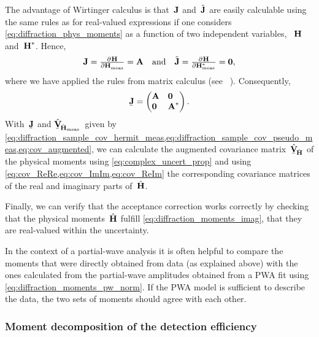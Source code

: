 The advantage of Wirtinger calculus is that~$\bm{\mathrm{J}}$
and~$\tilde{\bm{\mathrm{J}}}$ are easily calculable using the same rules as
for real-valued expressions if one considers
\cref{eq:diffraction_phys_moments} as a function of two independent
variables, ~$\bm{\mathrm{H}}$ and~$\bm{\mathrm{H}}^*$.  Hence,
\begin{equation}
  \mat{J}
  = \pd{\vect{H}}{\vect{H}_\text{meas}}
  = \mat{A}
  \quad\text{and}\quad
  \tilde{\mat{J}}
  = \pd{\vect{H}}{{\vect{H}_\text{meas}^*}}
  = \mat{0},
\end{equation}
where we have applied the rules from matrix calculus (see \eg\
).  Consequently,
\begin{equation}
  \underaccent{\bar}{\mat{J}}
  = \begin{pmatrix*}[l]
    \mat{A} & \mat{0} \\
    \mat{0} & \mat{A}^*
  \end{pmatrix*}.
\end{equation}
With~$\underaccent{\bar}{\mat{J}}$ and
$\hat{\underaccent{\bar}{\covMatSym}}_{\!\hat{\vect{H}}_\text{meas}}$~given
by
\cref{eq:diffraction_sample_cov_hermit_meas,eq:diffraction_sample_cov_pseudo_meas,eq:cov_augmented},
we can calculate the augmented covariance
matrix~$\hat{\underaccent{\bar}{\covMatSym}}_{\!\hat{\vect{H}}}$ of
the physical moments using \cref{eq:complex_uncert_prop} and using
\cref{eq:cov_ReRe,eq:cov_ImIm,eq:cov_ReIm} the corresponding
covariance matrices of the real and imaginary parts
of~$\hat{\bm{\mathrm{H}}}$.

Finally, we can verify that the acceptance correction works correctly
by checking that the physical moments~$\hat{\bm{\mathrm{H}}}$ fulfill
\cref{eq:diffraction_moments_imag}, \ie that they are real-valued
within the uncertainty.

In the context of a partial-wave analysis it is often helpful to
compare the moments that were directly obtained from data (as
explained above) with the ones calculated from the partial-wave
amplitudes obtained from a PWA fit using
\cref{eq:diffraction_moments_pw_norm}.  If the PWA model is sufficient
to describe the data, the two sets of moments should agree with each
other.


\subsubsection{Moment decomposition of the detection efficiency}%
\label{sec:diffraction:acceptance_moment_decomp}

